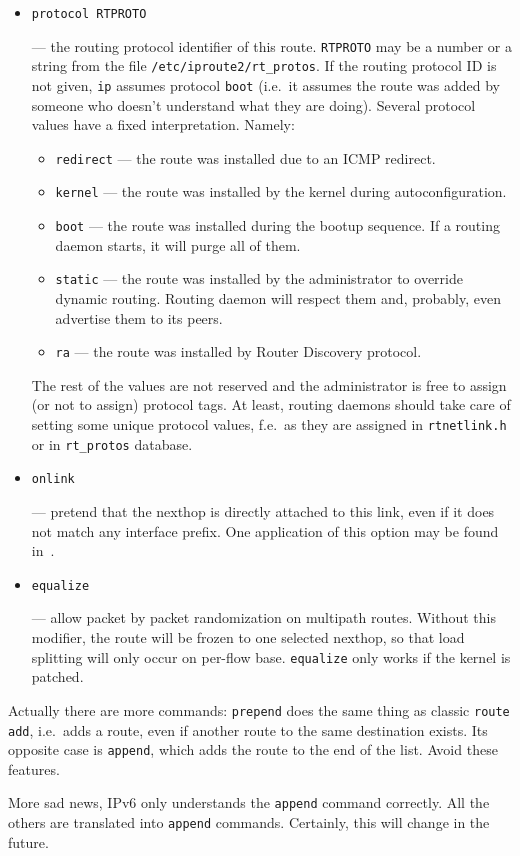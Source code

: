 \begin{itemize}
\item \verb|protocol RTPROTO|

--- the routing protocol identifier of this route.
\verb|RTPROTO| may be a number or a string from the file
\verb|/etc/iproute2/rt_protos|. If the routing protocol ID is
not given, \verb|ip| assumes protocol \verb|boot| (i.e.\
it assumes the route was added by someone who doesn't
understand what they are doing). Several protocol values have a fixed interpretation.
Namely:
\begin{itemize}
\item \verb|redirect| --- the route was installed due to an ICMP redirect.
\item \verb|kernel| --- the route was installed by the kernel during
autoconfiguration.
\item \verb|boot| --- the route was installed during the bootup sequence.
If a routing daemon starts, it will purge all of them.
\item \verb|static| --- the route was installed by the administrator
to override dynamic routing. Routing daemon will respect them
and, probably, even advertise them to its peers.
\item \verb|ra| --- the route was installed by Router Discovery protocol.
\end{itemize}
The rest of the values are not reserved and the administrator is free
to assign (or not to assign) protocol tags. At least, routing
daemons should take care of setting some unique protocol values,
f.e.\ as they are assigned in \verb|rtnetlink.h| or in \verb|rt_protos|
database.


\item \verb|onlink|

--- pretend that the nexthop is directly attached to this link,
even if it does not match any interface prefix. One application of this
option may be found in~\cite{IP-TUNNELS}.

\item \verb|equalize|

--- allow packet by packet randomization on multipath routes.
Without this modifier, the route will be frozen to one selected
nexthop, so that load splitting will only occur on per-flow base.
\verb|equalize| only works if the kernel is patched.


\end{itemize}


\begin{NB}
  Actually there are more commands: \verb|prepend| does the same
  thing as classic \verb|route add|, i.e.\ adds a route, even if another
  route to the same destination exists. Its opposite case is \verb|append|,
  which adds the route to the end of the list. Avoid these
  features.
\end{NB}
\begin{NB}
  More sad news, IPv6 only understands the \verb|append| command correctly.
  All the others are translated into \verb|append| commands. Certainly,
  this will change in the future.
\end{NB}

